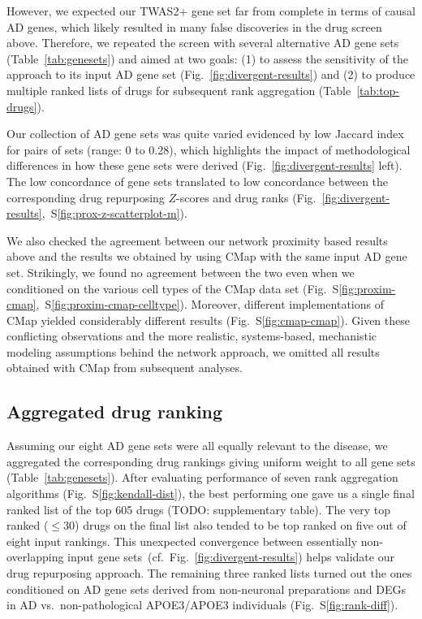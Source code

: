 \documentclass[letterpaper]{article}
\begin{document}
However, we expected our TWAS2+ gene set far from complete in terms of
causal AD genes, which likely resulted in many false discoveries in the
drug screen above.  Therefore, we repeated the screen with several alternative AD gene
sets (Table~\ref{tab:genesets}) and aimed at two goals: (1) to assess the
sensitivity of the approach to its input AD gene set
(Fig.~\ref{fig:divergent-results}) and (2) to produce multiple ranked lists of
drugs for subsequent rank aggregation (Table~\ref{tab:top-drugs}).

Our collection of AD gene sets was quite varied evidenced by low Jaccard index
for pairs of sets (range: 0 to 0.28), which
highlights the impact of methodological differences in how these gene sets
were derived (Fig.~\ref{fig:divergent-results} left). The low concordance of
gene sets translated to low concordance between the corresponding drug
repurposing $Z$-scores and drug ranks
(Fig.~\ref{fig:divergent-results},~S\ref{fig:prox-z-scatterplot-m}).

We also checked the agreement between our network proximity based results
above and the results we obtained by using CMap with the same input AD gene
set.  Strikingly, we found no agreement between the two even when we
conditioned on the various cell types of the CMap data set
(Fig.~S\ref{fig:proxim-cmap},~S\ref{fig:proxim-cmap-celltype}).  Moreover,
different implementations of CMap yielded considerably different results
(Fig.~S\ref{fig:cmap-cmap}).  Given these conflicting observations and the more realistic,
systems-based, mechanistic modeling assumptions behind the network approach,
we omitted all results obtained with CMap from subsequent analyses.

\subsection{Aggregated drug ranking}

Assuming our eight AD gene sets were all equally relevant to the disease, we
aggregated the corresponding drug rankings giving uniform weight to all gene
sets (Table~\ref{tab:genesets}).  After evaluating performance of seven rank
aggregation algorithms (Fig.~S\ref{fig:kendall-dist}), the best performing one
gave us a single final ranked list of the top 605 drugs (TODO: supplementary table).
The very top ranked ($\le 30$) drugs on the final list also tended to be top ranked
on five out of eight input rankings.  This unexpected convergence between
essentially non-overlapping input gene
sets~(cf.~Fig.~\ref{fig:divergent-results}) helps validate our drug repurposing approach.
The remaining three ranked lists turned out the ones
conditioned on AD gene sets derived from non-neuronal preparations and DEGs in
AD vs.~non-pathological APOE3/APOE3 individuals (Fig.~S\ref{fig:rank-diff}).
\end{document}
